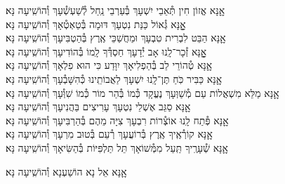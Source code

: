\documentclass[twoside, openany, parskip=half, 11pt]{book}
\begin{document}
\begin{small}
אׇׇנָּא אֱזוֹן חִין תְּ֯אֵבֵי יִשְׁעָךְ בְּ֯עַרְבֵי נַֽחַל לְ֯שַׁעְשְׁ֯עָךְ \hfill וְ֯הוֹשִֽׁיעָה נָּא׃\\
אׇׇׇׇָנָּא גְּ֯אוֹל כַּנַּת נִטְעָךְ דּוּמָה בְּ֯טַאְטְ֯אָךְ \hfill וְ֯הוֹשִֽׁיעָה נָּא׃\\
אׇׇנָּא הַבֵּט לִבְרִית טִבְעָךְ וּמַחֲשַׁכֵּי אֶֽרֶץ בְּ֯הַטְבִּיעָךְ \hfill וְ֯הוֹשִֽׁיעָה נָּא׃\\
אׇׇׇׇָנָּא זְ֯כָר־לָֽנוּ אָב יְ֯דָעָךְ חַסְדְּ֯ךָ לָֽמוֹ בְּ֯הוֹדִיעָךְ \hfill וְ֯הוֹשִֽׁיעָה נָּא׃\\
אׇׇנָּא טְ֯הוֹרֵי לֵב בְּ֯הַפְלִיאָךְ יִוָּדַע כִּי הוּא פִלְאָךְ \hfill וְ֯הוֹשִֽׁיעָה נָּא׃\\
אׇׇנָּא כַּבִּיר כֹּֽחַ תֶּן־לָֽנוּ יִשְׁעָךְ לַאֲבוֹתֵֽינוּ כְּ֯הִשָּׁבְ֯עָךְ \hfill וְ֯הוֹשִֽׁיעָה נָּא׃\\
אׇׇנָּא מַלֵּא מִשְׁאֲלוֹת עַם מְ֯שַׁוְּעָךְ נֶעֱקָד כְּ֯מוֹ בְּ֯הַר מוֹר כְּ֯מוֹ שִׁוְּ֯עָךְ \hfill וְ֯הוֹשִֽׁיעָה נָּא׃\\
אׇׇנָּא סַגֵּב אֶשְׁלֵי נִטְעָךְ עָרִיצִים בַּהֲנִיעָךְ \hfill וְ֯הוֹשִֽׁיעָה נָּא׃\\
אׇׇנָּא פְּ֯תַח לָֽנוּ אוֹצְ֯רוֹת רִבְעָךְ צִיָּה מֵהֶם בְּ֯הַרְבִּיעָךְ \hfill וְ֯הוֹשִֽׁיעָה נָּא׃\\
אׇׇנָּא קוֹרְ֯אֶֽיךָ אֶֽרֶץ בְּ֯רוֹעֲעָךְ רְ֯עֵם בְּ֯טוּב מִרְעָךְ \hfill וְ֯הוֹשִֽׁיעָה נָּא׃\\
אׇׇנָּא שְׁ֯עָרֶֽיךָ תַּֽעַל מִמְּ֯שׁוֹאָךְ תֵּל תַּלְפִּיּוֹת בְּ֯הַשִּׂיאָךְ \hfill וְ֯הוֹשִֽׁיעָה נָּא׃

\end{small}

\begin{large}
\shatzvkahal
אׇׇנָּא אֵל נָא הוֹשַׁעְנָא וְ֯הוֹשִֽׁיעָה נָּא׃

\end{large}
\end{document}
